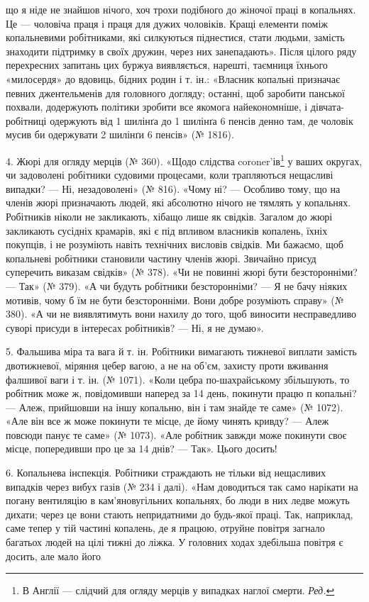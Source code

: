що я ніде не знайшов нічого, хоч трохи подібного до жіночої
праці в копальнях. Це — чоловіча праця і праця для дужих
чоловіків. Кращі елементи поміж копальневими робітниками,
які силкуються піднестися, стати людьми, замість знаходити підтримку
в своїх дружин, через них занепадають». Після цілого
ряду перехресних запитань цих буржуа виявляється, нарешті,
таємниця їхнього «милосердя» до вдовиць, бідних родин і т. ін.:
«Власник копальні призначає певних джентельменів для головного
догляду; останні, щоб заробити панської похвали, додержують
політики зробити все якомога найекономніше, і дівчата-робітниці
одержують від 1 шилінґа до 1 шилінґа 6 пенсів денно там,
де чоловік мусив би одержувати 2 шилінґи 6 пенсів» (№ 1816).

4. Жюрі для огляду мерців (№ 360). «Щодо слідства coroner’ів\footnote*{
В Англії — слідчий для огляду мерців у випадках наглої смерти. \emph{Ред.}
}
у ваших округах, чи задоволені робітники судовими процесами,
коли трапляються нещасливі випадки? — Ні, незадоволені»
(№ 816). «Чому ні? — Особливо тому, що на членів жюрі призначають
людей, які абсолютно нічого не тямлять у копальнях. Робітників
ніколи не закликають, хібащо лише як свідків. Загалом
до жюрі закликають сусідніх крамарів, які є під впливом власників
копалень, їхніх покупців, і не розуміють навіть технічних
висловів свідків. Ми бажаємо, щоб копальневі робітники становили
частину членів жюрі. Звичайно присуд суперечить виказам
свідків» (№ 378). «Чи не повинні жюрі бути безсторонніми? —
Так» (№ 379). «А чи будуть робітники безсторонніми? — Я не
бачу ніяких мотивів, чому б їм не бути безсторонніми. Вони
добре розуміють справу» (№ 380). «А чи не виявлятимуть вони
нахилу до того, щоб виносити несправедливо суворі присуди в
інтересах робітників? — Ні, я не думаю».

5. Фальшива міра та вага й т. ін. Робітники вимагають тижневої
виплати замість двотижневої, міряння цебер вагою, а не
на об’єм, захисту проти вживання фалшивої ваги і т. ін.
(№ 1071). «Коли цебра по-шахрайському збільшують, то робітник
може ж, повідомивши наперед за 14 день, покинути працю
п копальні? — Алеж, прийшовши на іншу копальню, він і там
знайде те саме» (№ 1072). «Але він все ж може покинути те місце,
де йому чинять кривду? — Алеж повсюди панує те саме» (№ 1073).
«Але робітник завжди може покинути своє місце, попередивши
про це за 14 днів? — Так». Цього досить!

6. Копальнева інспекція. Робітники страждають не тільки
від нещасливих випадків через вибух газів (№ 234 і далі). «Нам
доводиться так само нарікати на погану вентиляцію в кам’яновугільних
копальнях, бо люди в них ледве можуть дихати;
через це вони стають непридатними до будь-якої праці. Так,
наприклад, саме тепер у тій частині копалень, де я працюю,
отруйне повітря загнало багатьох людей на цілі тижні до ліжка.
У головних ходах здебільша повітря є досить, але мало його